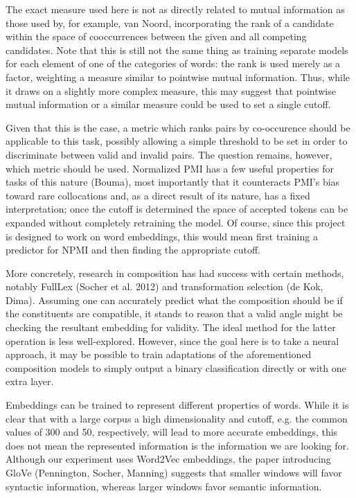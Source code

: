 \documentclass{article}
\begin{document}
The exact measure used here is not as directly related to mutual information as those used by, for example, van Noord, incorporating the rank of a candidate within the space of cooccurrences between the given and all competing candidates. Note that this is still not the same thing as training separate models for each element of one of the categories of words: the rank is used merely as a factor, weighting a measure similar to pointwise mutual information. Thus, while it draws on a slightly more complex measure, this may suggest that pointwise mutual information or a similar measure could be used to set a single cutoff.

Given that this is the case, a metric which ranks pairs by co-occurence should be applicable to this task, possibly allowing a simple threshold to be set in order to discriminate between valid and invalid pairs. The question remains, however, which metric should be used. Normalized PMI has a few useful properties for tasks of this nature (Bouma), most importantly that it counteracts PMI's bias toward rare collocations and, as a direct result of its nature, has a fixed interpretation; once the cutoff is determined the space of accepted tokens can be expanded without completely retraining the model. Of course, since this project is designed to work on word embeddings, this would mean first training a predictor for NPMI and then finding the appropriate cutoff.

More concretely, research in composition has had success with certain methods, notably FullLex (Socher et al. 2012) and transformation selection (de Kok, Dima). Assuming one can accurately predict what the composition should be if the constituents are compatible, it stands to reason that a valid angle might be checking the resultant embedding for validity. The ideal method for the latter operation is less well-explored. However, since the goal here is to take a neural approach, it may be possible to train adaptations of the aforementioned composition models to simply output a binary classification directly or with one extra layer.

Embeddings can be trained to represent different properties of words. While it is clear that with a large corpus a high dimensionality and cutoff, e.g. the common values of 300 and 50, respectively, will lead to more accurate embeddings, this does not mean the represented information is the information we are looking for. Although our experiment uses Word2Vec embeddings, the paper introducing GloVe (Pennington, Socher, Manning) suggests that smaller windows will favor syntactic information, whereas larger windows favor semantic information.
\end{document}
